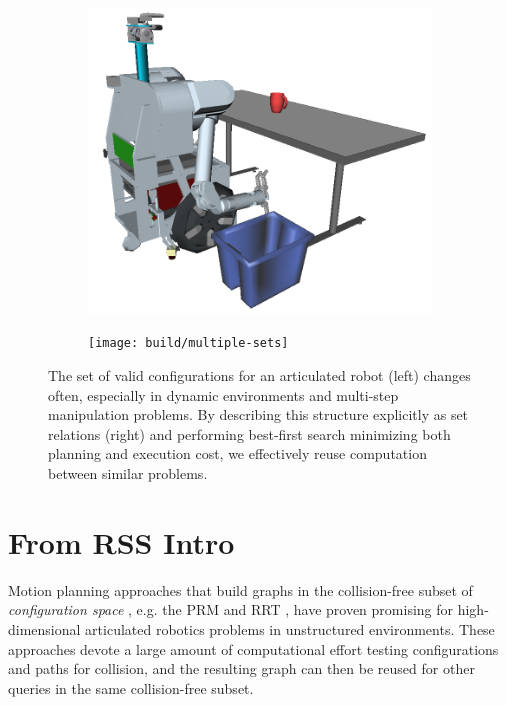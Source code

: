 \documentclass{report}
\begin{document}
\begin{figure}
\centering
\begin{subfigure}[b]{.45\linewidth}
\includegraphics[width=\columnwidth]{figs/simple-table-clearing-task.png}
\end{subfigure}%
\quad%
\begin{subfigure}[b]{.45\linewidth}
\texttt{[image: build/multiple-sets]}
\end{subfigure}
\caption{
  The set of valid configurations for an articulated robot (left)
  changes often,
  especially in dynamic environments
  and multi-step manipulation problems.
  By describing this structure explicitly as set relations (right)
  and performing best-first search
  minimizing both planning and execution cost,
  we effectively reuse computation between similar
  problems.}
\label{fig:manip-example}
\end{figure}

\section{From RSS Intro}

Motion planning approaches that build graphs
in the collision-free subset of
\emph{configuration space} \cite{lozanoperez1983cspace},
e.g. the
PRM \cite{kavrakietal1996prm}
and RRT \cite{lavallekuffner1999rrt},
have proven promising
for high-dimensional articulated robotics problems
in unstructured environments.
These approaches devote a large amount of computational effort
testing configurations and paths for collision,
and the resulting graph can then be reused
for other queries in the same collision-free subset.
\end{document}
